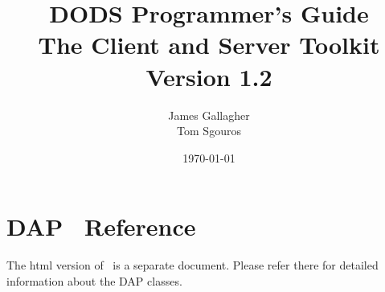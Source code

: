 \documentclass{dods-book}
\newcommand{\DOCversion}{Version 1.2}
\begin{document}
\title{DODS Programmer's Guide\\ The Client and Server Toolkit\\\DOCversion} 
\author{James Gallagher \\ Tom Sgouros}
\date{\today}
\maketitle

\W{}



\tableofcontents
\listoffigures
\listoftables

\clearemptydoublepage













\chapter{DAP \Cpp\ Reference}
\label{tk,classref}
The html version of \OPDapiref\ is a separate document.  Please
refer there for detailed information about the DAP classes.
\end{document}
